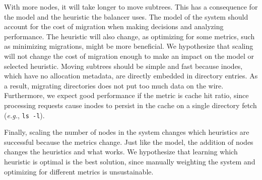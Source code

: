 With more nodes, it will take longer to move subtrees. This has a consequence for the model and the heuristic the balancer uses. The model of the system should account for the cost of migration when making decisions and analyzing performance. The heuristic will also change, as optimizing for some metrics, such as minimizing migrations, might be more beneficial. We hypothesize that scaling will not change the cost of migration enough to make an impact on the model or selected heuristic. Moving subtrees should be simple and fast because inodes, which have no allocation metadata, are directly embedded in directory entries. As a result, migrating directories does not put too much data on the wire. Furthermore, we expect good performance if the metric is cache hit ratio, since processing requests cause inodes to persist in the cache on a single directory fetch ({\it e.g.}, \texttt{ls -l}).

Finally, scaling the number of nodes in the system changes which heuristics are successful because the metrics change. Just like the model, the addition of nodes changes the heuristics and what works. We hypothesize that learning which heuristic is optimal is the best solution, since manually weighting the system and optimizing for different metrics is unsustainable. 
